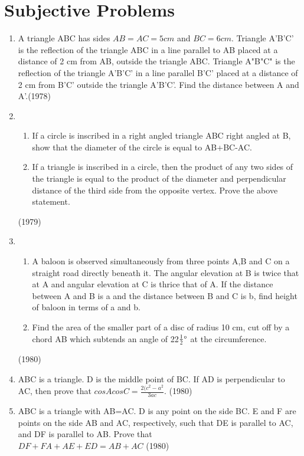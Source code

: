 \documentclass[journal,12pt,twocolumn]{IEEEtran}
\theoremstyle{remark}
\begin{document}
\section{Subjective Problems}

\begin{enumerate}[label=\arabic*.]
    \item A triangle ABC has sides $AB=AC=5 cm$ and $BC =6 cm$. Triangle A'B'C' is the reflection of the triangle ABC in a line parallel to AB placed at a distance of 2 cm from AB, outside the triangle ABC. Triangle A"B"C" is the reflection of the triangle A'B'C' in a line parallel B'C' placed at a distance of 2 cm from B'C' outside the triangle A'B'C'. Find the distance between A and A'.\hfill {(1978)}
    \item 
    \begin{enumerate}[label=(\alph*)]
    \item If a circle is inscribed in a right angled triangle ABC right angled at B, show that the diameter of the circle is equal to AB+BC-AC.
    \item If a triangle is inscribed in a circle, then the product of any two sides of the triangle is equal to the product of the diameter and perpendicular distance of the third side from the opposite vertex. Prove the above statement.
    \end{enumerate}
    \hfill {(1979)}
    \item
    \begin{enumerate}[label=(\alph*)]
    \item A baloon is observed simultaneously from three points A,B and C on a straight road directly beneath it. The angular elevation at B is twice that at A and angular elevation at C is thrice that of A. If the distance between A and B is a and the distance between B and C is b, find height of baloon in terms of a and b.
    \item Find the area of the smaller part of a disc of radius 10 cm, cut off by a chord AB which subtends an angle of 22$\frac{1}{2} \degree$ at the circumference.
    \end{enumerate}
    \hfill {(1980)}
    \item ABC is a triangle. D is the middle point of BC. If AD is perpendicular to AC, then prove that $cosAcosC = \frac{2(c^{2}-a^{2}}{3ac}$.
    \hfill {(1980)}
    \item ABC is a triangle with AB=AC. D is any point on the side BC. E and F are points on the side AB and AC, respectively, such that DE is parallel to AC, and DF is parallel to AB. Prove that \\
    $DF + FA + AE + ED = AB+AC$
    \hfill {(1980)} 
\end{enumerate}
\end{document}
